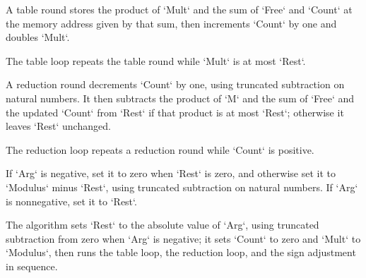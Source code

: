 \begin{definition}
\label{Light.emodTableRound}
\leanok
{}
A table round stores the product of `Mult` and the sum of `Free` and `Count` at the
memory address given by that sum, then increments `Count` by one and doubles `Mult`.
\end{definition}

\begin{definition}
\label{Light.emodTable}
\leanok
{}
The table loop repeats the table round while `Mult` is at most `Rest`.
\end{definition}

\begin{definition}
\label{Light.emodReduceRound}
\leanok
{}
A reduction round decrements `Count` by one, using truncated subtraction on natural
numbers. It then subtracts the product of `M` and the sum of `Free` and the updated
`Count` from `Rest` if that product is at most `Rest`; otherwise it leaves `Rest`
unchanged.
\end{definition}

\begin{definition}
\label{Light.emodReduce}
\leanok
{}
The reduction loop repeats a reduction round while `Count` is positive.
\end{definition}

\begin{definition}
\label{Light.emodSign}
\leanok
{}
If `Arg` is negative, set it to zero when `Rest` is zero, and otherwise set it to
`Modulus` minus `Rest`, using truncated subtraction on natural numbers. If `Arg` is
nonnegative, set it to `Rest`.
\end{definition}

\begin{definition}
\label{Light.emodBody}
\leanok
{}
The algorithm sets `Rest` to the absolute value of `Arg`, using truncated subtraction
from zero when `Arg` is negative; it sets `Count` to zero and `Mult` to `Modulus`, then
runs the table loop, the reduction loop, and the sign adjustment in sequence.
\end{definition}

